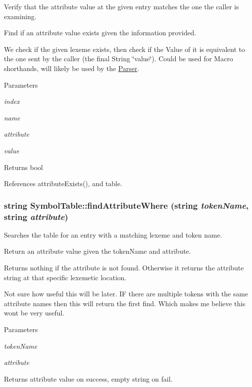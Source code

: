 Verify that the attribute value at the given entry matches the one the caller is examining. 

Find if an attribute value exists given the information provided.

We check if the given lexeme exists, then check if the Value of it is equivalent to the one sent by the caller (the final String \char`\"{}value\char`\"{}). Could be used for Macro shorthands, will likely be used by the \hyperlink{classParser}{Parser}.


\begin{DoxyParams}{Parameters}
\item[{\em index}]\item[{\em name}]\item[{\em attribute}]\item[{\em value}]\end{DoxyParams}
\begin{DoxyReturn}{Returns}
bool 
\end{DoxyReturn}


References attributeExists(), and table.

\hypertarget{classSymbolTable_a0b0bdb5b1a6095782c6c4f318737a0a9}{
\subsubsection[{findAttributeWhere}]{\setlength{\rightskip}{0pt plus 5cm}string SymbolTable::findAttributeWhere (string {\em tokenName}, \/  string {\em attribute})}}
\label{classSymbolTable_a0b0bdb5b1a6095782c6c4f318737a0a9}


Searches the table for an entry with a matching lexeme and token name. 

Return an attribute value given the tokenName and attribute.

Returns nothing if the attribute is not found. Otherwise it returns the attribute string at that specific lexemetic location.

Not sure how useful this will be later. IF there are multiple tokens with the same attribute names then this will return the first find. Which makes me believe this wont be very useful. 
\begin{DoxyParams}{Parameters}
\item[{\em tokenName}]\item[{\em attribute}]\end{DoxyParams}
\begin{DoxyReturn}{Returns}
attribute value on success, empty string on fail. 
\end{DoxyReturn}


